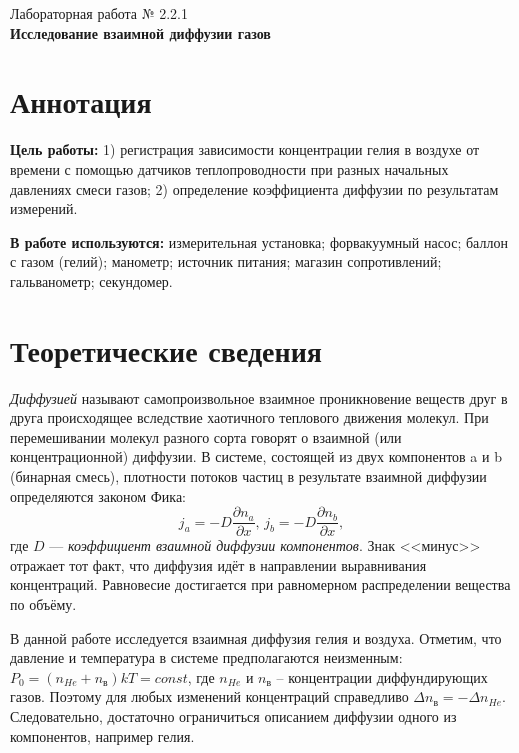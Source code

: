 \documentclass[a4paper,12pt]{article} %
\begin{document}
\begin{center}   
	\large{Лабораторная работа № 2.2.1\\\textbf{Исследование взаимной диффузии газов}}\\
\end{center}

\section{Аннотация}

\noindent\textbf{Цель работы:}
1) регистрация зависимости концентрации гелия в воздухе от времени с помощью датчиков теплопроводности при разных начальных давлениях смеси газов; 2) определение коэффициента диффузии по результатам измерений.
	
\smallskip
\noindent\textbf{В работе используются:}
измерительная установка; форвакуумный насос; баллон с газом (гелий); манометр; источник питания; магазин сопротивлений; гальванометр; секундомер.

\section{Теоретические сведения}

\textit{Диффузией}  называют самопроизвольное взаимное проникновение веществ друг в друга происходящее вследствие хаотичного теплового движения молекул. При перемешивании молекул разного сорта говорят о взаимной (или концентрационной) диффузии. В системе, состоящей из двух компонентов a и b (бинарная смесь), плотности потоков частиц в результате взаимной диффузии определяются законом Фика:
\begin{equation}
    j_a = -D \frac{\partial n_a}{\partial x}, \, j_b = -D \frac{\partial n_b}{\partial x},
\end{equation}
где $D$ — \textit{коэффициент взаимной диффузии компонентов}. Знак <<минус>> отражает тот факт, что диффузия идёт в направлении выравнивания концентраций. Равновесие достигается при равномерном распределении вещества по объёму.

В данной работе исследуется взаимная диффузия гелия и воздуха. Отметим, что давление и температура в системе предполагаются неизменным: $P_0 = (n_{He}+n_{в})kT = const$, где $n_{He}$  и $n_{в}$ -- концентрации диффундирующих газов. Поэтому для любых изменений концентраций справедливо $\Delta n_{в} = -\Delta n_{He}$. Следовательно, достаточно ограничиться описанием диффузии одного из компонентов, например гелия.
\end{document}
